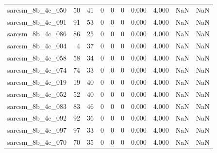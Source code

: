 \documentclass{article}
\begin{document}
\begin{longtable}{lrrrrrrrrr}
sarcsm\_8b\_4c\_050 & 50 & 41 & 0 & 0 & 0 & 0.000 & 4.000 & NaN & NaN \\
sarcsm\_8b\_4c\_091 & 91 & 53 & 0 & 0 & 0 & 0.000 & 4.000 & NaN & NaN \\
sarcsm\_8b\_4c\_086 & 86 & 25 & 0 & 0 & 0 & 0.000 & 4.000 & NaN & NaN \\
sarcsm\_8b\_4c\_004 & 4 & 37 & 0 & 0 & 0 & 0.000 & 4.000 & NaN & NaN \\
sarcsm\_8b\_4c\_058 & 58 & 34 & 0 & 0 & 0 & 0.000 & 4.000 & NaN & NaN \\
sarcsm\_8b\_4c\_074 & 74 & 33 & 0 & 0 & 0 & 0.000 & 4.000 & NaN & NaN \\
sarcsm\_8b\_4c\_019 & 19 & 40 & 0 & 0 & 0 & 0.000 & 4.000 & NaN & NaN \\
sarcsm\_8b\_4c\_052 & 52 & 40 & 0 & 0 & 0 & 0.000 & 4.000 & NaN & NaN \\
sarcsm\_8b\_4c\_083 & 83 & 46 & 0 & 0 & 0 & 0.000 & 4.000 & NaN & NaN \\
sarcsm\_8b\_4c\_092 & 92 & 36 & 0 & 0 & 0 & 0.000 & 4.000 & NaN & NaN \\
sarcsm\_8b\_4c\_097 & 97 & 33 & 0 & 0 & 0 & 0.000 & 4.000 & NaN & NaN \\
sarcsm\_8b\_4c\_070 & 70 & 35 & 0 & 0 & 0 & 0.000 & 4.000 & NaN & NaN \\
\end{longtable}
\end{document}
